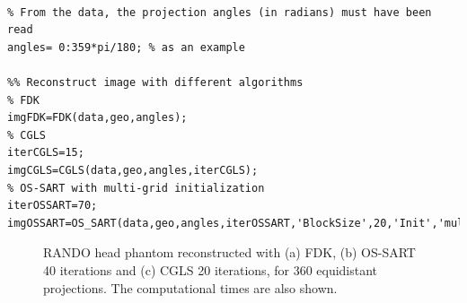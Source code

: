 \begin{lstlisting}[style=Matlab-editor,
basicstyle=\scriptsize,
caption= RANDO head data reconstruction,
label={cs:randohead},
frame = single
]
% Define Geometry & load data

% From the data, the projection angles (in radians) must have been read
angles= 0:359*pi/180; % as an example 

%% Reconstruct image with different algorithms
% FDK
imgFDK=FDK(data,geo,angles);
% CGLS
iterCGLS=15;
imgCGLS=CGLS(data,geo,angles,iterCGLS);
% OS-SART with multi-grid initialization
iterOSSART=70; 
imgOSSART=OS_SART(data,geo,angles,iterOSSART,'BlockSize',20,'Init','multigrid');

\end{lstlisting}





\begin{figure}
\centering
{}

\caption[RANDO head recosntructed in TIGRE using FDk,OS-SART and CGLS]{\label{fig:RANDOTIGRE} RANDO head phantom reconstructed with (a) FDK, (b) OS-SART 40 iterations and (c) CGLS 20 iterations, for 360 equidistant projections. The computational times are also shown.} 
\end{figure}



